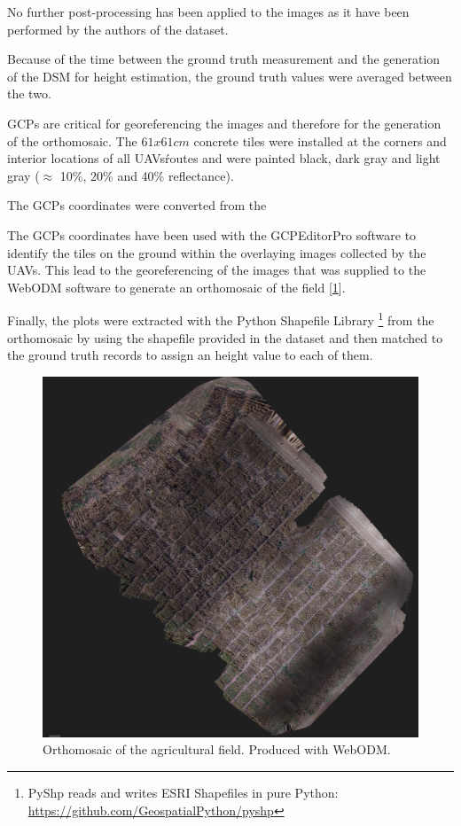 No further post-processing has been applied to the images as it have been performed by the authors of the dataset.

Because of the time between the ground truth measurement and the generation of the DSM for height estimation, the ground truth values were averaged between the two.

GCPs are critical for georeferencing the images and therefore for the generation of the orthomosaic. The $61x61cm$ concrete tiles were installed at the corners and interior locations of all UAVs\' routes and were painted black, dark gray and light gray ($\approx$ 10\%, 20\% and 40\% reflectance).

The GCPs coordinates were converted from the 

The GCPs coordinates have been used with the GCPEditorPro software to identify the tiles on the ground within the overlaying images collected by the UAVs.
This lead to the georeferencing of the images that was supplied to the WebODM software to generate an orthomosaic of the field [\ref{fig:orthomosaic}].

Finally, the plots were extracted with the Python Shapefile Library \footnote{PyShp reads and writes ESRI Shapefiles in pure Python: \url{https://github.com/GeospatialPython/pyshp}} from the orthomosaic by using the shapefile provided in the dataset and then matched to the ground truth records to assign an height value to each of them.

\begin{figure}[b!]
    \includegraphics[width=\linewidth]{../images/orthomosaic} 
    \caption{Orthomosaic of the agricultural field. Produced with WebODM.}
    \label{fig:orthomosaic}
\end{figure}